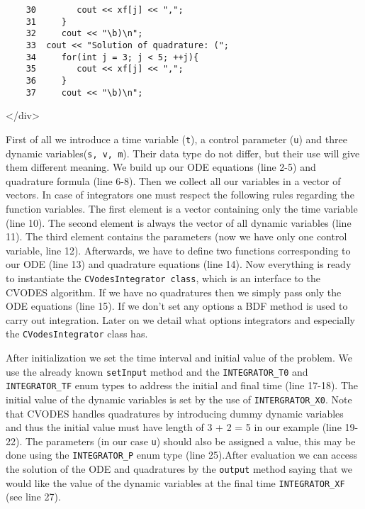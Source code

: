 \documentclass[a4paper,12pt]{book}
\newcommand{\codeend}{
\begin{rawhtml}
</div>
\end{rawhtml}
}
\newcommand{\codeend}{

}
\begin{document}
{\begin{verbatim}
    30        cout << xf[j] << ",";
    31     }
    32     cout << "\b)\n";
    33  cout << "Solution of quadrature: (";
    34     for(int j = 3; j < 5; ++j){
    35        cout << xf[j] << ",";
    36     }
    37     cout << "\b)\n";
\end{verbatim}
\codeend
First of all we introduce a time variable (\texttt{t}), a control parameter (\texttt{u}) and three dynamic variables(\texttt{s, v, m}).
Their data type do not differ, but their use will give them different meaning. We build up our ODE equations (line 2-5) and quadrature formula
(line 6-8). Then we collect all our variables in a vector of vectors. In case of integrators one must respect the following rules regarding the
function variables. The first element
is a vector containing only the time variable (line 10). The second element is always the vector of all dynamic variables (line 11).
The third element contains the parameters (now we have only one control variable, line 12). Afterwards, we have to define two functions corresponding
to our ODE (line 13) and quadrature equations (line 14). Now everything is ready to instantiate the \texttt{CVodesIntegrator class}, which is an interface
to the CVODES algorithm. If we have no quadratures then we simply pass only the ODE equations (line 15). If we don't set any options a BDF method is used
to carry out integration. Later on we detail what options integrators and especially the \texttt{CVodesIntegrator} class has.
\par After initialization we set the time interval and initial value of the problem. We use the already known \texttt{setInput} method and the
\texttt{INTEGRATOR\_T0} and \texttt{INTEGRATOR\_TF} enum types to address the initial and final time (line 17-18). The initial value of the dynamic
variables is set by the use of \texttt{INTERGRATOR\_X0}. Note that CVODES handles quadratures by introducing dummy dynamic variables and thus the initial
value must have length of 3 + 2 = 5 in our example (line 19-22). The parameters (in our case \texttt{u}) should also be assigned a value, this may be done
using the \texttt{INTEGRATOR\_P} enum type (line 25).After evaluation we can access the solution of the ODE and quadratures by the \texttt{output} method
saying that we would like the value of the dynamic variables at the final time \texttt{INTEGRATOR\_XF} (see line 27).
}
\end{document}
